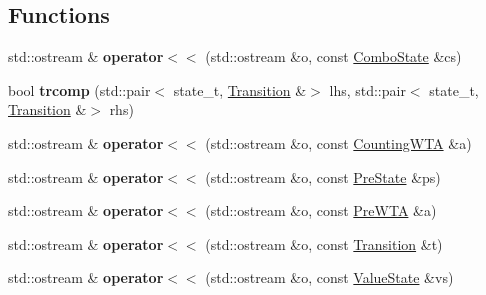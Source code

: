 \subsection*{Functions}
\begin{DoxyCompactItemize}
\item 
\mbox{\label{group__schemata_gaacfb8dd676081cbdacc586bd08ef5339}} 
std\+::ostream \& {\bfseries operator$<$$<$} (std\+::ostream \&o, const \mbox{\hyperlink{classComboState}{Combo\+State}} \&cs)
\item 
\mbox{\label{group__schemata_ga5876dc1d6e1700ecd64b79abc371f852}} 
bool {\bfseries trcomp} (std\+::pair$<$ state\+\_\+t, \mbox{\hyperlink{classTransition}{Transition}} \&$>$ lhs, std\+::pair$<$ state\+\_\+t, \mbox{\hyperlink{classTransition}{Transition}} \&$>$ rhs)
\item 
\mbox{\label{group__schemata_gaf522606427f33e50d5ccd45945e140ac}} 
std\+::ostream \& {\bfseries operator$<$$<$} (std\+::ostream \&o, const \mbox{\hyperlink{classCountingWTA}{Counting\+W\+TA}} \&a)
\item 
\mbox{\label{group__schemata_gaf8b99aabcea05e6f7f8b31da07ee3790}} 
std\+::ostream \& {\bfseries operator$<$$<$} (std\+::ostream \&o, const \mbox{\hyperlink{classPreState}{Pre\+State}} \&ps)
\item 
\mbox{\label{group__schemata_ga9bf0c703002e360545ebd943f933fb18}} 
std\+::ostream \& {\bfseries operator$<$$<$} (std\+::ostream \&o, const \mbox{\hyperlink{classPreWTA}{Pre\+W\+TA}} \&a)
\item 
\mbox{\label{group__schemata_gaf1cd2ec3c46754e845d9083fcca78307}} 
std\+::ostream \& {\bfseries operator$<$$<$} (std\+::ostream \&o, const \mbox{\hyperlink{classTransition}{Transition}} \&t)
\item 
\mbox{\label{group__schemata_ga3e1e0cf974d650010f69166d22e7d0da}} 
std\+::ostream \& {\bfseries operator$<$$<$} (std\+::ostream \&o, const \mbox{\hyperlink{classValueState}{Value\+State}} \&vs)
\item 
\mbox{\label{group__schemata_ga83eaab443b166582ff8beee576b4fd51}} 

\end{DoxyCompactItemize}
